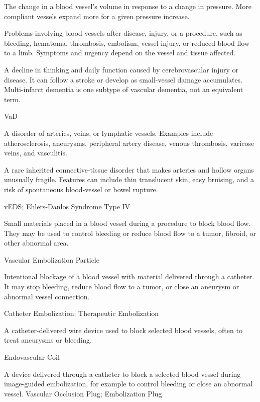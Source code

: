  The change in a blood vessel’s volume in response to a change in pressure. More compliant vessels expand more for a given pressure increase.

 Problems involving blood vessels after disease, injury, or a procedure, such as bleeding, hematoma, thrombosis, embolism, vessel injury, or reduced blood flow to a limb. Symptoms and urgency depend on the vessel and tissue affected.

 A decline in thinking and daily function caused by cerebrovascular injury or disease. It can follow a stroke or develop as small-vessel damage accumulates. Multi-infarct dementia is one subtype of vascular dementia, not an equivalent term.

\synonyms
VaD

 A disorder of arteries, veins, or lymphatic vessels. Examples include atherosclerosis, aneurysms, peripheral artery disease, venous thrombosis, varicose veins, and vasculitis.

 A rare inherited connective-tissue disorder that makes arteries and hollow organs unusually fragile. Features can include thin translucent skin, easy bruising, and a risk of spontaneous blood-vessel or bowel rupture.

\synonyms
vEDS; Ehlers-Danlos Syndrome Type IV

 Small materials placed in a blood vessel during a procedure to block blood flow. They may be used to control bleeding or reduce blood flow to a tumor, fibroid, or other abnormal area.

\synonyms
Vascular Embolization Particle

 Intentional blockage of a blood vessel with material delivered through a catheter. It may stop bleeding, reduce blood flow to a tumor, or close an aneurysm or abnormal vessel connection.

\synonyms
Catheter Embolization; Therapeutic Embolization

 A catheter-delivered wire device used to block selected blood vessels, often to treat aneurysms or bleeding.

\synonyms
Endovascular Coil

 A device delivered through a catheter to block a selected blood vessel during image-guided embolization, for example to control bleeding or close an abnormal vessel.
\synonyms
Vascular Occlusion Plug; Embolization Plug

